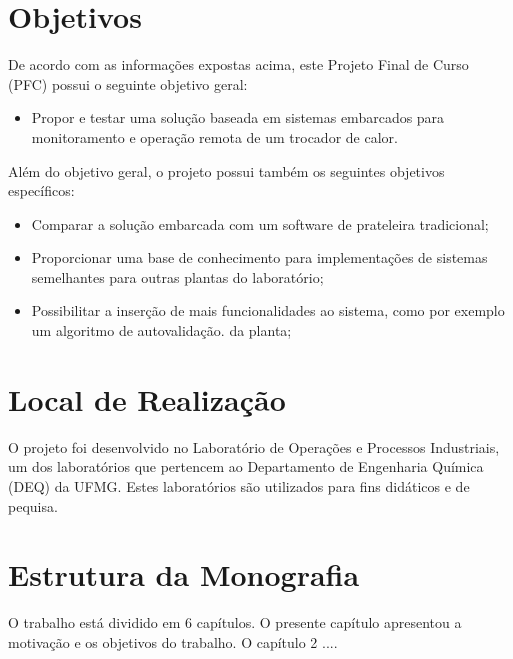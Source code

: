 		
	
\section{Objetivos}
	De acordo com as informações expostas acima, este Projeto Final de Curso (PFC) possui o seguinte objetivo geral:
	
	\begin{itemize}
		\item 
		Propor e testar uma solução baseada em sistemas embarcados para monitoramento e operação remota de um trocador de calor.
	\end{itemize}
	
	Além do objetivo geral, o projeto possui também os seguintes objetivos específicos:
	
	\begin{itemize}
		\item 
		Comparar a solução embarcada com um software de prateleira tradicional;
		\item 
		Proporcionar uma base de conhecimento para implementações de sistemas semelhantes para outras plantas do laboratório;
		\item 
		Possibilitar a inserção de mais funcionalidades ao sistema, como por exemplo um algoritmo de autovalidação. da planta;
	\end{itemize}
	

\section{Local de Realização}
	O projeto foi desenvolvido no Laboratório de Operações e Processos Industriais, um dos laboratórios que pertencem ao Departamento de Engenharia Química (DEQ) da UFMG. Estes laboratórios são utilizados para fins didáticos e de pequisa.

\section{Estrutura da Monografia}
	O trabalho está dividido em 6 capítulos. O presente capítulo apresentou a motivação e os objetivos do trabalho. O capítulo 2 .... 
